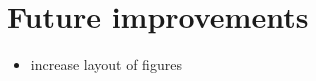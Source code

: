 \FloatBarrier\section{Future improvements}
\begin{itemize}
\item increase layout of figures
\end{itemize}
